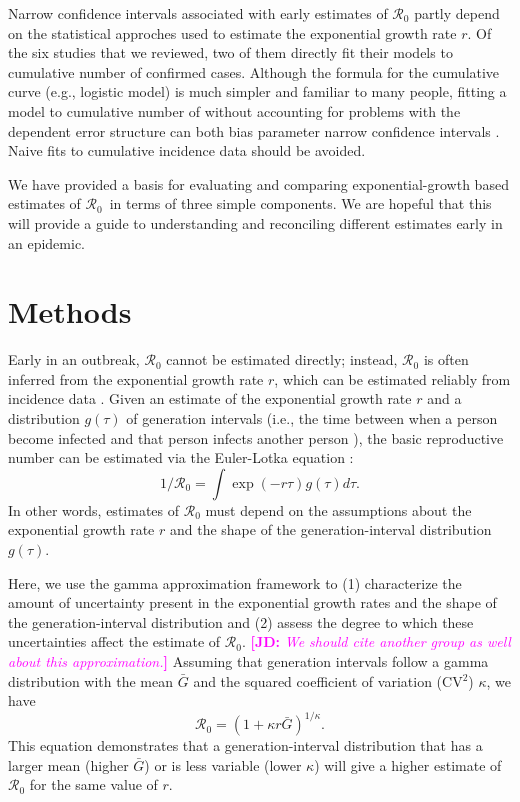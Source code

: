 \documentclass[12pt]{article}
\newcommand{\Rx}[1]{\ensuremath{{\mathcal R}_{#1}}}
\newcommand{\Ro}{\Rx{0}}
\newcommand{\comment}[3]{\textcolor{#1}{\textbf{[#2: }\textsl{#3}\textbf{]}}}
\newcommand{\jd}[1]{\comment{magenta}{JD}{#1}}
\begin{document}
Narrow confidence intervals associated with early estimates of $\mathcal R_0$ partly depend on the statistical approches used to estimate the exponential growth rate $r$.
Of the six studies that we reviewed, two of them directly fit their models to cumulative number of confirmed cases.
Although the formula for the cumulative curve (e.g., logistic model) is much simpler and familiar to many people, fitting a model to cumulative number of without accounting for problems with the dependent error structure can both bias parameter narrow confidence intervals \citep{ma2014estimating, king2015avoidable}.
Naive fits to cumulative incidence data should be avoided.

We have provided a basis for evaluating and comparing exponential-growth based estimates of \Ro\ in terms of three simple components. We are hopeful that this will provide a guide to understanding and reconciling different estimates early in an epidemic.

\section{Methods}

Early in an outbreak, $\mathcal R_0$ cannot be estimated directly;
instead, $\mathcal R_0$ is often inferred from
the exponential growth rate $r$, which can be estimated reliably from incidence data \citep{mills2004transmissibility, nishiura2009transmission, ma2014estimating}. 
Given an estimate of the exponential growth rate $r$ and a distribution $g(\tau)$ of
generation intervals (i.e., the time between when a person become 
infected and that person infects another person \citep{svensson2007note}), the basic reproductive
number can be estimated via the Euler-Lotka equation \citep{wallinga2007generation}:
\begin{equation}
1/\mathcal R_0 = \int \exp(-r\tau) g(\tau) d\tau.
\end{equation}
In other words, estimates of $\mathcal R_0$ must
depend on the assumptions about the
exponential growth rate $r$ and the shape of the generation-interval distribution $g(\tau)$.

Here, we use the gamma approximation framework \citep{park2019practical} to (1) characterize the amount of uncertainty present in the exponential growth rates and the shape of the generation-interval distribution and (2) assess the degree to which these uncertainties affect the estimate of $\mathcal R_0$.
\jd{We should cite another group as well about this approximation.}
Assuming that generation intervals follow a gamma distribution
with the mean $\bar G$ and the squared coefficient of variation (CV$^2$) $\kappa$, 
we have
\begin{equation}
\mathcal R_0 = \left(1 + \kappa r \bar{G}\right)^{1/\kappa}.
\label{eq:gamma}
\end{equation}
This equation demonstrates that a generation-interval distribution
that has a larger mean (higher $\bar{G}$) or is less variable (lower $\kappa$)
will give a higher estimate of $\mathcal R_0$ for the same value of $r$.
\end{document}
